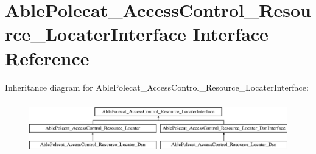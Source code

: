 \hypertarget{interface_able_polecat___access_control___resource___locater_interface}{}\section{Able\+Polecat\+\_\+\+Access\+Control\+\_\+\+Resource\+\_\+\+Locater\+Interface Interface Reference}
\label{interface_able_polecat___access_control___resource___locater_interface}
Inheritance diagram for Able\+Polecat\+\_\+\+Access\+Control\+\_\+\+Resource\+\_\+\+Locater\+Interface\+:\begin{figure}[H]
\begin{center}
\leavevmode
\includegraphics[height=2.282609cm]{interface_able_polecat___access_control___resource___locater_interface}
\end{center}
\end{figure}
